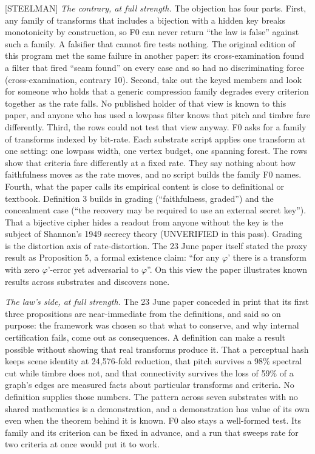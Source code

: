 \documentclass[11pt]{article}
\newcommand{\register}[1]{{\ttfamily\small #1}}
\begin{document}
\register{[STEELMAN]} \emph{The contrary, at full strength.} The objection has four parts. First, any family of transforms that includes a bijection with a hidden key breaks monotonicity by construction, so F0 can never return ``the law is false'' against such a family. A falsifier that cannot fire tests nothing. The original edition of this program met the same failure in another paper: its cross-examination found a filter that fired ``seam found'' on every case and so had no discriminating force (cross-examination, contrary 10). Second, take out the keyed members and look for someone who holds that a generic compression family degrades every criterion together as the rate falls. No published holder of that view is known to this paper, and anyone who has used a lowpass filter knows that pitch and timbre fare differently. Third, the rows could not test that view anyway. F0 asks for a family of transforms indexed by bit-rate. Each substrate script applies one transform at one setting: one lowpass width, one vertex budget, one spanning forest. The rows show that criteria fare differently at a fixed rate. They say nothing about how faithfulness moves as the rate moves, and no script builds the family F0 names. Fourth, what the paper calls its empirical content is close to definitional or textbook. Definition 3 builds in grading (``faithfulness, graded'') and the concealment case (``the recovery may be required to use an external secret key''). That a bijective cipher hides a readout from anyone without the key is the subject of Shannon's 1949 secrecy theory (UNVERIFIED in this pass). Grading is the distortion axis of rate-distortion. The 23 June paper itself stated the proxy result as Proposition 5, a formal existence claim: ``for any \ensuremath{\varphi}' there is a transform with zero \ensuremath{\varphi}'-error yet adversarial to \ensuremath{\varphi}''. On this view the paper illustrates known results across substrates and discovers none.

\emph{The law's side, at full strength.} The 23 June paper conceded in print that its first three propositions are near-immediate from the definitions, and said so on purpose: the framework was chosen so that what to conserve, and why internal certification fails, come out as consequences. A definition can make a result possible without showing that real transforms produce it. That a perceptual hash keeps scene identity at 24,576-fold reduction, that pitch survives a 98\% spectral cut while timbre does not, and that connectivity survives the loss of 59\% of a graph's edges are measured facts about particular transforms and criteria. No definition supplies those numbers. The pattern across seven substrates with no shared mathematics is a demonstration, and a demonstration has value of its own even when the theorem behind it is known. F0 also stays a well-formed test. Its family and its criterion can be fixed in advance, and a run that sweeps rate for two criteria at once would put it to work.
\end{document}
